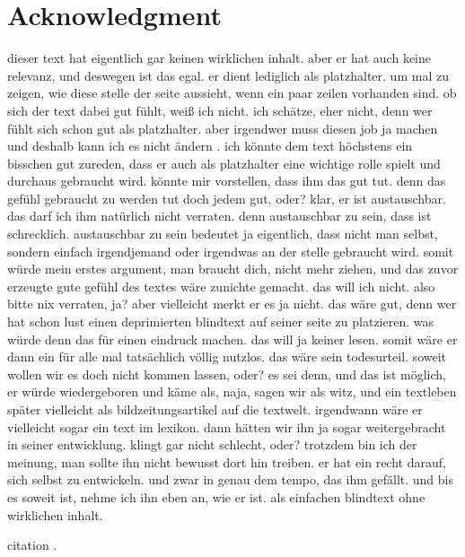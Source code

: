 \documentclass[conference]{IEEEtran}
\begin{document}
\section{Acknowledgment}
dieser text hat eigentlich gar keinen wirklichen inhalt. aber er hat auch keine relevanz, und deswegen ist das egal. er dient lediglich als platzhalter. um mal zu zeigen, wie diese stelle der seite aussieht, wenn ein paar zeilen vorhanden sind. ob sich der text dabei gut fühlt, weiß ich nicht. ich schätze, eher nicht, denn wer fühlt sich schon gut als platzhalter. aber irgendwer muss diesen job ja machen und deshalb kann ich es nicht ändern . ich könnte dem text höchstens ein bisschen gut zureden, dass er auch als platzhalter eine wichtige rolle spielt und durchaus gebraucht wird. könnte mir vorstellen, dass ihm das gut tut. denn das gefühl gebraucht zu werden tut doch jedem gut, oder? klar, er ist austauschbar. das darf ich ihm natürlich nicht verraten. denn austauschbar zu sein, dass ist schrecklich. austauschbar zu sein bedeutet ja eigentlich, dass nicht man selbst, sondern einfach irgendjemand oder irgendwas an der stelle gebraucht wird. somit würde mein erstes argument, man braucht dich, nicht mehr ziehen, und das zuvor erzeugte gute gefühl des textes wäre zunichte gemacht. das will ich nicht. also bitte nix verraten, ja? aber vielleicht merkt er es ja nicht. das wäre gut, denn wer hat schon lust einen deprimierten blindtext auf seiner seite zu platzieren. was würde denn das für einen eindruck machen. das will ja keiner lesen. somit wäre er dann ein für alle mal tatsächlich völlig nutzlos. das wäre sein todesurteil. soweit wollen wir es doch nicht kommen lassen, oder? es sei denn, und das ist möglich, er würde wiedergeboren und käme als, naja, sagen wir als witz, und ein textleben später vielleicht als bildzeitungsartikel auf die textwelt. irgendwann wäre er vielleicht sogar ein text im lexikon. dann hätten wir ihn ja sogar weitergebracht in seiner entwicklung. klingt gar nicht schlecht, oder? trotzdem bin ich der meinung, man sollte ihn nicht bewusst dort hin treiben. er hat ein recht darauf, sich selbst zu entwickeln. und zwar in genau dem tempo, das ihm gefällt. und bis es soweit ist, nehme ich ihn eben an, wie er ist. als einfachen blindtext ohne wirklichen inhalt.


 citation \cite{b6}.
\end{document}
